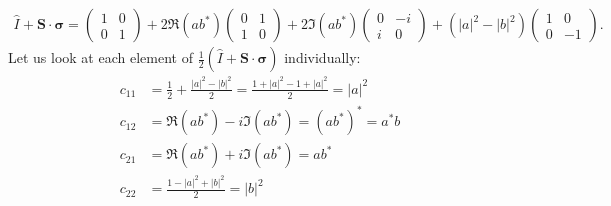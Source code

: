 \documentclass{article}
\numberwithin{equation}{section}
\begin{document}
\begin{enumerate}
\begin{enumerate}
\begin{enumerate}
\begin{align*}
                \hat{I} + \bm{S}\cdot\bm{\sigma} = \begin{pmatrix}
                    1 & 0 \\ 0 & 1
                \end{pmatrix} + 2\Re(ab^*)\begin{pmatrix}
                    0 & 1 \\ 1 & 0
                \end{pmatrix} + 2\Im(ab^*)\begin{pmatrix}
                    0 & -i \\ 
                    i & 0
                \end{pmatrix} + \left(|a|^2-|b|^2\right)\begin{pmatrix}
                    1 & 0 \\ 
                    0 & -1
                \end{pmatrix}.
            \end{align*}
            Let us look at each element of $\frac{1}{2}(\hat{I}+\bm{S}\cdot\bm{\sigma})$ individually:
            \begin{align*}
                c_{11} &= \frac{1}{2} + \frac{|a|^2-|b|^2}{2} = \frac{1+|a|^2-1+|a|^2}{2} = |a|^2 \\
                c_{12} &= \Re(ab^*) -i\Im(ab^*) = (ab^*)^* = a^*b \\ 
                c_{21} &= \Re(ab^*)+i\Im(ab^*) = ab^* \\
                c_{22} &= \frac{1-|a|^2+|b|^2}{2} = |b|^2
            \end{align*}
        \end{enumerate}
    
    \end{enumerate}
\end{enumerate}
\end{document}
